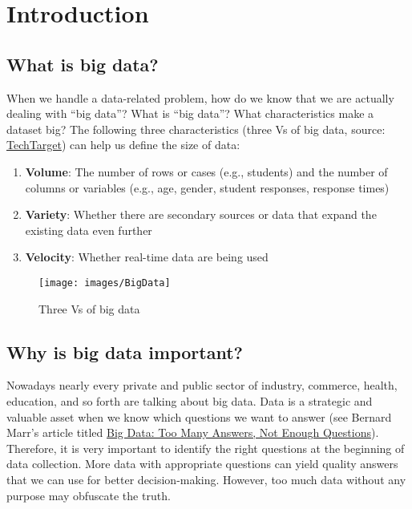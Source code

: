 \documentclass[
]{book}
\begin{document}
\hypertarget{intro}{%
\chapter{Introduction}\label{intro}}

\hypertarget{what-is-big-data}{%
\section{What is big data?}\label{what-is-big-data}}

When we handle a data-related problem, how do we know that we are actually dealing with ``big data''? What is ``big data''? What characteristics make a dataset big? The following three characteristics (three Vs of big data, source: \href{https://whatis.techtarget.com/definition/3Vs}{TechTarget}) can help us define the size of data:

\begin{enumerate}
\def\labelenumi{\arabic{enumi}.}
\item
  \textbf{Volume}: The number of rows or cases (e.g., students) and the number of columns or variables (e.g., age, gender, student responses, response times)
\item
  \textbf{Variety}: Whether there are secondary sources or data that expand the existing data even further
\item
  \textbf{Velocity}: Whether real-time data are being used
\end{enumerate}

\begin{figure}
\texttt{[image: images/BigData]} \caption{Three Vs of big data}\label{fig:fig1-1}
\end{figure}

\hypertarget{why-is-big-data-important}{%
\section{Why is big data important?}\label{why-is-big-data-important}}

Nowadays nearly every private and public sector of industry, commerce, health, education, and so forth are talking about big data. Data is a strategic and valuable asset when we know which questions we want to answer (see Bernard Marr's article titled \href{https://www.forbes.com/sites/bernardmarr/2015/08/25/big-data-too-many-answers-not-enough-questions/\#527635fb1361}{Big Data: Too Many Answers, Not Enough Questions}). Therefore, it is very important to identify the right questions at the beginning of data collection. More data with appropriate questions can yield quality answers that we can use for better decision-making. However, too much data without any purpose may obfuscate the truth.
\end{document}
